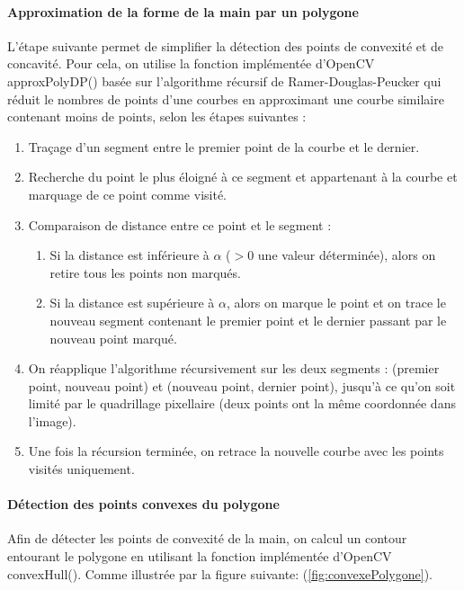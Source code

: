\paragraph{Approximation de la forme de la main par un polygone}
L’étape suivante permet de simplifier la détection des points de convexité et de concavité. Pour cela, on utilise la fonction implémentée d’OpenCV approxPolyDP() basée sur l’algorithme récursif de Ramer-Douglas-Peucker qui réduit le nombres de points d’une courbes en approximant une courbe similaire contenant moins de points, selon les étapes suivantes :

\begin{enumerate}
\item Traçage d’un segment entre le premier point de la courbe et le dernier.
\item Recherche du point le plus éloigné à ce segment et appartenant à la courbe et marquage de ce point comme visité.
\item Comparaison de distance entre ce point et le segment :
\begin{enumerate}
\item Si la distance est inférieure à $\alpha$ ($>0$ une valeur déterminée), alors on retire tous les points non marqués.
\item Si la distance est supérieure à $\alpha$, alors on marque le point et on trace le nouveau segment contenant le premier point et le dernier passant par le nouveau point marqué.
\end{enumerate}
\item On réapplique l’algorithme récursivement sur les deux segments : (premier point, nouveau point) et (nouveau point, dernier point), jusqu'à ce qu'on soit limité par le quadrillage pixellaire (deux points ont la même coordonnée dans l'image).
\item Une fois la récursion terminée, on retrace la nouvelle courbe avec les points visités uniquement.
\end{enumerate}

\paragraph{Détection des points convexes du polygone}
Afin de détecter les points de convexité de la main, on calcul un contour entourant le polygone en utilisant la fonction implémentée d’OpenCV convexHull(). Comme illustrée par la figure suivante: (\autoref{fig:convexePolygone}).

